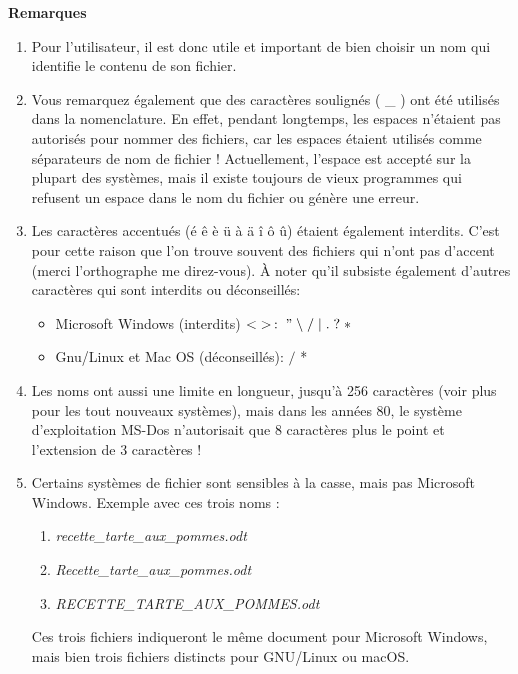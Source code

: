 \textbf{Remarques} 
\begin{enumerate}
	\item Pour l’utilisateur, il est donc utile et important de bien choisir un nom qui identifie le contenu de son fichier.
	\item Vous remarquez également que des caractères soulignés ( \_ ) ont été utilisés dans la nomenclature. En effet, pendant longtemps, les espaces n’étaient pas autorisés pour nommer des fichiers, car les espaces étaient utilisés comme séparateurs de nom de fichier ! Actuellement, l’espace est accepté sur la plupart des systèmes, mais il existe toujours de vieux programmes qui refusent un espace dans le nom du fichier ou génère une erreur.
	\item Les caractères accentués (é ê è ü à ä î ô û) étaient également interdits. C’est pour cette raison que l’on trouve souvent des fichiers qui n’ont pas d’accent (merci l’orthographe me direz-vous). À noter qu’il subsiste également d’autres caractères qui sont interdits ou déconseillés:
	\begin{itemize}
		\item Microsoft Windows (interdits) $< \; >  \,  :  \;   " \;   \backslash \;  / \; \vert \; . \; ? \; *$ 
		\item Gnu/Linux et Mac OS (déconseillés): $/$ * 
	\end{itemize}
	\item Les noms ont aussi une limite en longueur, jusqu’à 256 caractères (voir plus pour les tout nouveaux systèmes), mais dans les années 80, le système d’exploitation MS-Dos n’autorisait que 8 caractères plus le point et l’extension de 3 caractères !
	\item Certains systèmes de fichier sont sensibles à la casse, mais pas Microsoft Windows. Exemple avec ces trois noms :
	\begin{enumerate}
		\item {\it recette\_tarte\_aux\_pommes.odt}
		\item {\it Recette\_tarte\_aux\_pommes.odt}
		\item {\it RECETTE\_TARTE\_AUX\_POMMES.odt}
	\end{enumerate}
	Ces trois fichiers indiqueront le même document pour Microsoft Windows, mais bien trois fichiers distincts pour GNU/Linux ou macOS.
\end{enumerate}

